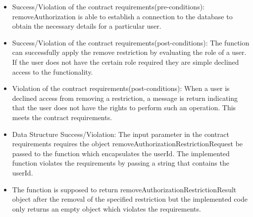 \begin{itemize}
	\item Success/Violation of the contract requirements(pre-conditions): removeAuthorization is able to establish a connection to the database to obtain the necessary details for a particular user.


	\item Success/Violation of the contract requirements(post-conditions): The function can successfully apply the remove restriction by evaluating the role of a user. If the user does not have the certain role required they are simple declined access to the functionality.


	\item Violation of the contract requirements(post-conditions): When a user is declined access from removing a restriction, a message is return indicating that the user does not have the rights to perform such an operation. This meets the contract requirements.



	\item Data Structure Success/Violation: The input parameter in the contract requirements requires the object removeAuthorizationRestrictionRequest be passed to the function which encapsulates the userId. The implemented function violates the requirements by passing a string that contains the userId.
	\item The function is supposed to return removeAuthorizationRestrictionResult object after the removal of the specified restriction but the implemented code only returns an empty object which violates the requirements.
\end{itemize} 







